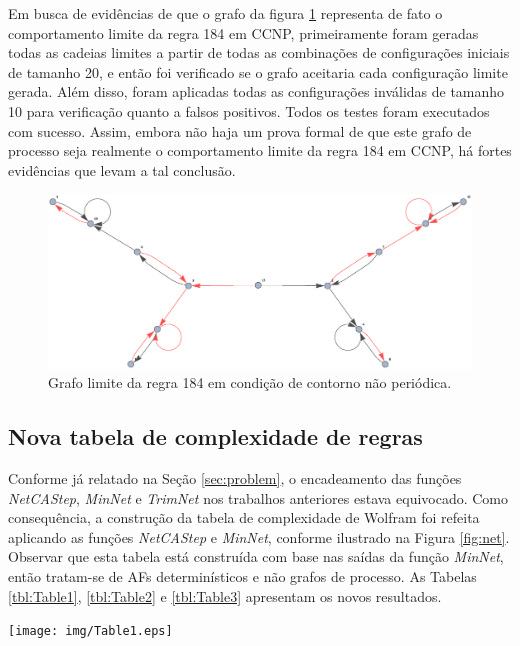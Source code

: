 \documentclass[12pt,a4paper]{article}
\begin{document}
Em busca de evidências de que o grafo da figura \ref{fig:limit184w} representa
de fato o comportamento limite da regra 184 em CCNP, primeiramente foram geradas
todas as cadeias limites a partir de todas as combinações de configurações
iniciais de tamanho 20, e então foi verificado se o grafo aceitaria cada
configuração limite gerada. Além disso, foram aplicadas todas as configurações
inválidas de tamanho 10 para verificação quanto a falsos positivos. Todos os
testes foram executados com sucesso.
Assim, embora não haja um prova formal de que este grafo de processo seja
realmente o comportamento limite da regra 184 em CCNP, há fortes evidências que
levam a tal conclusão.

\begin{figure}[htp]
\begin{center}
\includegraphics[scale=0.60]{img/limit184w.eps}
\caption{Grafo limite da regra 184 em condição de contorno não periódica.}
\label{fig:limit184w}
\end{center}
\end{figure}

\subsection{Nova tabela de complexidade de regras}\label{sec:table}

Conforme já relatado na Seção \ref{sec:problem}, o encadeamento das
funções \emph{NetCAStep}, \emph{MinNet} e \emph{TrimNet} nos trabalhos anteriores estava
equivocado. Como consequência, a construção da tabela de complexidade
de Wolfram foi refeita aplicando as funções \emph{NetCAStep} e
\emph{MinNet}, conforme ilustrado na Figura \ref{fig:net}. Observar que esta
tabela está construída com base nas saídas da função \emph{MinNet}, então
tratam-se de AFs determinísticos e não grafos de processo.
As Tabelas \ref{tbl:Table1}, \ref{tbl:Table2} e \ref{tbl:Table3}
apresentam os novos resultados.

\begin{table}
\centering
\texttt{[image: img/Table1.eps]}
\caption{Tabela de complexidade de linguagens regulares (1/3).}
\label{tbl:Table1}
\end{table}
\end{document}
